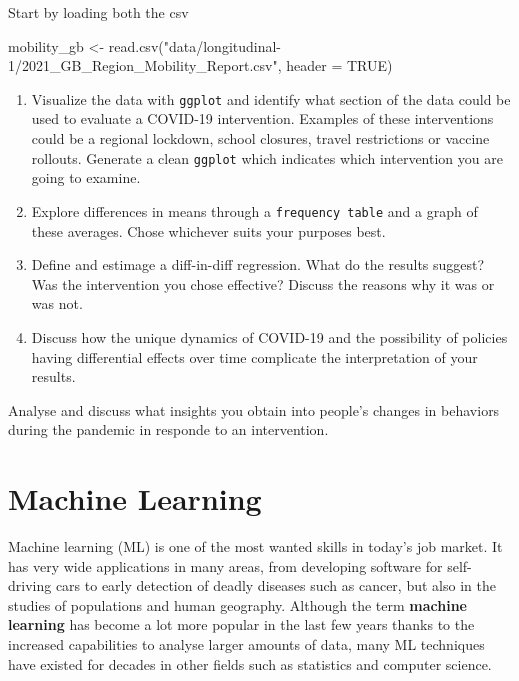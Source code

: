 \documentclass[
  letterpaper,
  DIV=11,
  numbers=noendperiod]{scrreprt}
\newenvironment{Shaded}{\begin{snugshade}}{\end{snugshade}}
\newcommand{\AttributeTok}[1]{\textcolor[rgb]{0.40,0.45,0.13}{#1}}
\newcommand{\ConstantTok}[1]{\textcolor[rgb]{0.56,0.35,0.01}{#1}}
\newcommand{\FunctionTok}[1]{\textcolor[rgb]{0.28,0.35,0.67}{#1}}
\newcommand{\NormalTok}[1]{\textcolor[rgb]{0.00,0.23,0.31}{#1}}
\newcommand{\OtherTok}[1]{\textcolor[rgb]{0.00,0.23,0.31}{#1}}
\newcommand{\StringTok}[1]{\textcolor[rgb]{0.13,0.47,0.30}{#1}}
\begin{document}
Start by loading both the csv

\begin{Shaded}
\begin{Highlighting}[]
\NormalTok{mobility\_gb }\OtherTok{\textless{}{-}} \FunctionTok{read.csv}\NormalTok{(}\StringTok{"data/longitudinal{-}1/2021\_GB\_Region\_Mobility\_Report.csv"}\NormalTok{, }\AttributeTok{header =} \ConstantTok{TRUE}\NormalTok{)}
\end{Highlighting}
\end{Shaded}

\begin{enumerate}
\def\labelenumi{\arabic{enumi}.}
\item
  Visualize the data with \texttt{ggplot} and identify what section of
  the data could be used to evaluate a COVID-19 intervention. Examples
  of these interventions could be a regional lockdown, school closures,
  travel restrictions or vaccine rollouts. Generate a clean
  \texttt{ggplot} which indicates which intervention you are going to
  examine.
\item
  Explore differences in means through a \texttt{frequency\ table} and a
  graph of these averages. Chose whichever suits your purposes best.
\item
  Define and estimage a diff-in-diff regression. What do the results
  suggest? Was the intervention you chose effective? Discuss the reasons
  why it was or was not.
\item
  Discuss how the unique dynamics of COVID-19 and the possibility of
  policies having differential effects over time complicate the
  interpretation of your results.
\end{enumerate}

Analyse and discuss what insights you obtain into people's changes in
behaviors during the pandemic in responde to an intervention.


\hypertarget{sec-chp10}{%
\chapter{Machine Learning}\label{sec-chp10}}

Machine learning (ML) is one of the most wanted skills in today's job
market. It has very wide applications in many areas, from developing
software for self-driving cars to early detection of deadly diseases
such as cancer, but also in the studies of populations and human
geography. Although the term \textbf{machine learning} has become a lot
more popular in the last few years thanks to the increased capabilities
to analyse larger amounts of data, many ML techniques have existed for
decades in other fields such as statistics and computer science.
\end{document}
